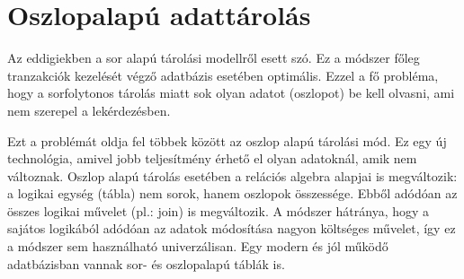 \documentclass[12pt]{article}
\theoremstyle{plain}
\begin{document}
\section{Oszlopalapú adattárolás}
Az eddigiekben a sor alapú tárolási modellről esett szó. Ez a módszer főleg tranzakciók kezelését végző adatbázis esetében optimális. Ezzel a fő probléma, hogy a sorfolytonos tárolás miatt sok olyan adatot (oszlopot) be kell olvasni, ami nem szerepel a lekérdezésben. \par
Ezt a problémát oldja fel többek között az oszlop alapú tárolási mód. Ez egy új technológia, amivel jobb teljesítmény érhető el olyan adatoknál, amik nem változnak. Oszlop alapú tárolás esetében a relációs algebra alapjai is megváltozik: a logikai egység (tábla) nem sorok, hanem oszlopok összessége. Ebből adódóan az összes logikai művelet (pl.: join) is megváltozik. A módszer hátránya, hogy a sajátos logikából adódóan az adatok módosítása nagyon költséges művelet, így ez a módszer sem használható univerzálisan. Egy modern és jól működő adatbázisban vannak sor- és oszlopalapú táblák is.

\vfill



\end{document}
